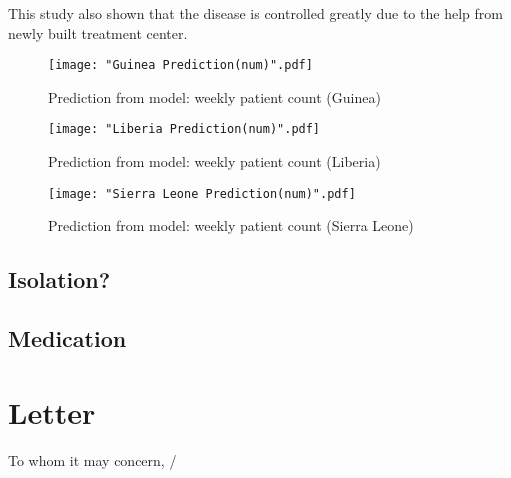 \documentclass[11pt]{article}
\begin{document}

This study also shown that the disease is controlled greatly due to the help from newly built treatment center.

\begin{figure}[htbp]
\centerline{\texttt{[image: "Guinea Prediction(num)".pdf]}}
\caption{Prediction from model: weekly patient count (Guinea)}
\label{GuineaPrediction2}
\end{figure}

\begin{figure}[htbp]
\centerline{\texttt{[image: "Liberia Prediction(num)".pdf]}}
\caption{Prediction from model: weekly patient count (Liberia)}
\label{LiberiaPrediction2}
\end{figure}

\begin{figure}[htbp]
\centerline{\texttt{[image: "Sierra Leone Prediction(num)".pdf]}}
\caption{Prediction from model: weekly patient count (Sierra Leone)}
\label{SierraLeonePrediction2}
\end{figure}

\subsection{Isolation?}

\subsection{Medication}

\section{Letter}%

To whom it may concern, /
\end{document}
